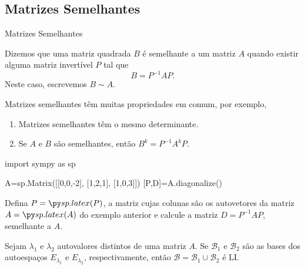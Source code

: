 \subsection*{Matrizes Semelhantes}
\begin{frame}[label=autovalores]{Matrizes Semelhantes}
\begin{defin}
Dizemos que uma {\color{red}matriz quadrada} $B$ é {\color{blue}semelhante} a um matriz $A$ quando existir alguma matriz invertível $P$ tal que 
\[B=P^{-1}AP.\]
Neste caso, escrevemos $B\sim A$.
\end{defin}

Matrizes semelhantes têm muitas propriedades em comum, por exemplo, 

\begin{enumerate}
\item Matrizes semelhantes têm o mesmo determinante.
\item Se $A$ e $B$ são semelhantes, então $B^k=P^{-1}A^kP$.
\end{enumerate}





\end{frame}

\begin{frame}[label=autovalores,fragile=singleslide]{}
\begin{pycode}
import sympy as sp

A=sp.Matrix([[0,0,-2], [1,2,1], [1,0,3]])
[P,D]=A.diagonalize()
\end{pycode}

\begin{exe}
Defina $P=\pyl{P}$, a matriz cujas colunas são os autovetores da matriz 
$A=\pyl{A} $ do exemplo anterior e calcule a matriz  $D=P^{-1}AP$, semelhante a $A$.
\end{exe}

\begin{teo}
Sejam $\lambda_1$ e $\lambda_2$ {\color{red}autovalores distintos} de uma matriz $A$. Se $\mathcal{B}_1$ e $\mathcal{B}_2$ são as bases dos autoespaços $E_{\lambda_1}$ e $E_{\lambda_2}$, respectivamente, então $\mathcal{B}=\mathcal{B}_1\cup \mathcal{B}_2$ é LI.
\end{teo}

\end{frame}


